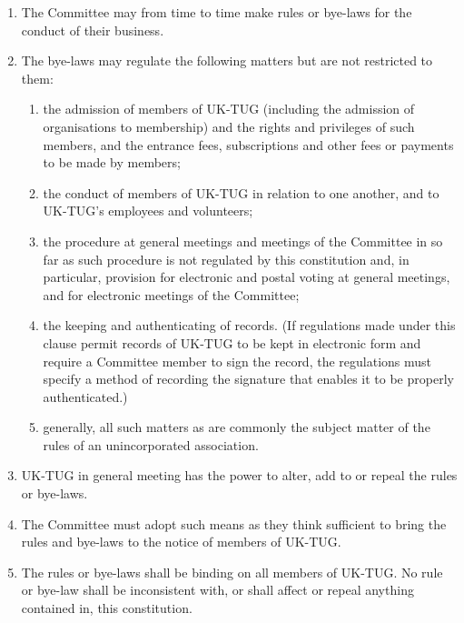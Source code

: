 \documentclass[a4paper,11pt]{article}
\begin{document}
\begin{enumerate}
\item The Committee may from time to time make rules or bye-laws for the conduct
  of their business.
\item The bye-laws may regulate the following matters but are not restricted to
  them:
  \begin{enumerate}
  \item the admission of members of UK-TUG (including the admission of
    organisations to membership) and the rights and privileges of such members,
    and the entrance fees, subscriptions and other fees or payments to be made
    by members;
  \item the conduct of members of UK-TUG in relation to one another, and to
    UK-TUG's employees and volunteers;
  \item the procedure at general meetings and meetings of the Committee in so
    far as such procedure is not regulated by this constitution and, in particular, provision for electronic and postal voting at general meetings, and for electronic meetings of the Committee;
  \item the keeping and authenticating of records. (If regulations made under
    this clause permit records of UK-TUG to be kept in electronic form and
    require a Committee member to sign the record, the regulations must specify
    a method of recording the signature that enables it to be properly
    authenticated.)
  \item generally, all such matters as are commonly the subject matter of the
    rules of an unincorporated association.
  \end{enumerate}
\item UK-TUG in general meeting has the power to alter, add to or repeal the
  rules or bye-laws.
\item The Committee must adopt such means as they think sufficient to bring the
  rules and bye-laws to the notice of members of UK-TUG.
\item The rules or bye-laws shall be binding on all members of UK-TUG. No rule
  or bye-law shall be inconsistent with, or shall affect or repeal anything
  contained in, this constitution.
\end{enumerate}
\end{document}
